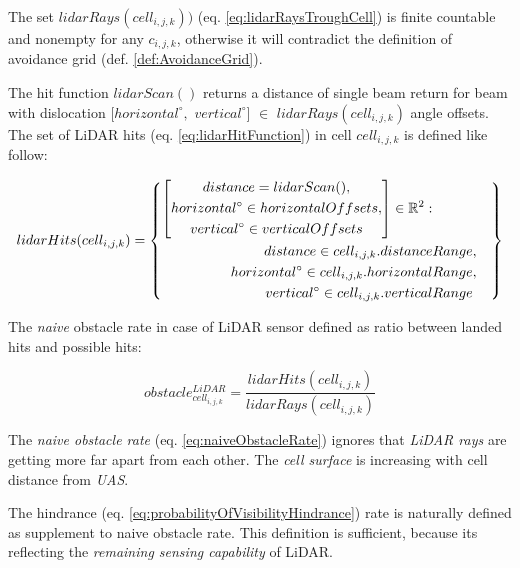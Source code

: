 The set $lidar Rays(cell_{i,j,k}))$ (eq. \ref{eq:lidarRaysTroughCell}) is finite countable and nonempty for any $c_{i,j,k}$, otherwise it will contradict   the definition of avoidance grid (def. \ref{def:AvoidanceGrid}).

The hit function $lidarScan()$ returns a distance of single beam return for beam with dislocation $[horizontal^\circ,$ $vertical^\circ]$ $\in$ $lidar Rays(cell_{i,j,k})$ angle offsets. The set of LiDAR hits (eq. \ref{eq:lidarHitFunction}) in cell $cell_{i,j,k}$ is defined like follow:

\begin{equation}\label{eq:lidarHitFunction}
    lidar Hits(cell_{i,j,k})=\left\{
        \begin{aligned}
        \left[
            \begin{gathered}
                distance=lidar Scan(),\\
                horizontal^\circ\in horizontal Offsets,\\
                vertical^\circ\in vertical Offsets
            \end{gathered}
        \right]\in\mathbb{R}^2:&\\
        distance \in cell_{i,j,k}.distance &Range,\\
        horizontal^\circ\in cell_{i,j,k}.horizontal &Range,\\
        vertical^\circ\in cell_{i,j,k}.vertical &Range\\
        \end{aligned}
    \right\}
\end{equation}

\noindent The \emph{naive} obstacle rate in case of LiDAR sensor defined as ratio between landed hits and possible hits:

\begin{equation}\label{eq:naiveObstacleRate}
    obstacle^{LiDAR}_{cell_{i,j,k}}=\frac{lidar Hits(cell_{i,j,k})}{lidar Rays(cell_{i,j,k})}
\end{equation}

\begin{note}
    The \emph{naive obstacle rate} (eq. \ref{eq:naiveObstacleRate}) ignores that \emph{LiDAR rays} are getting more far apart from each other. The \emph{cell surface} is increasing with cell distance from \emph{UAS}.
\end{note}

\noindent The hindrance (eq. \ref{eq:probabilityOfVisibilityHindrance}) rate is naturally defined as supplement to naive obstacle rate. This definition is sufficient, because its reflecting the \emph{remaining sensing capability} of  LiDAR.

